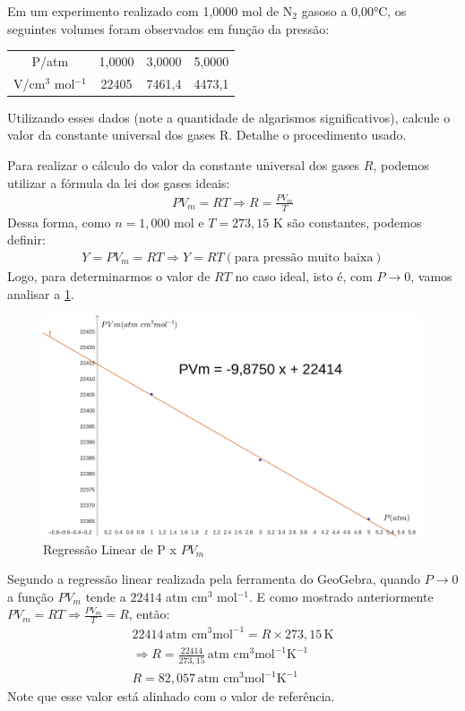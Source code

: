 \begin{xcs}
    Em um experimento realizado com 1,0000 mol de N\(_2\) gasoso a 0,00°C, os
    seguintes volumes foram observados em função da pressão: 
    \begin{center}
    \begin{tabular}{c | c c c}
    \hline
        P/atm & 1,0000 & 3,0000 & 5,0000\\
        V/cm\(^3\) mol\(^{-1}\) & 22405 & 7461,4 & 4473,1\\
    \hline
    \end{tabular}
    \end{center}
    Utilizando esses dados (note a quantidade de algarismos significativos),
    calcule o valor da constante universal dos gases R. Detalhe o procedimento
    usado.
\end{xcs}
\begin{rsl}
    
    Para realizar o cálculo do valor da constante universal dos gases \( R \),
    podemos utilizar a fórmula da lei dos gases ideais: 
    \begin{align*}
        PV_m = RT \Rightarrow R = \frac{PV_m}{T}
    \end{align*}
    Dessa forma, como \( n = 1,000 \) mol e \( T = 273,15 \) K são constantes,
    podemos definir:
    \begin{align*}
        Y = PV_m = RT \Rightarrow Y = RT (\text{para pressão
        muito baixa})
    \end{align*}
    Logo, para determinarmos o valor de \( RT \) no caso ideal, 
    isto é, com \( P \to 0 \), vamos analisar a \cref{reggeo}.

    \begin{figure}[H]
        \centering
        \includegraphics[width=.5\linewidth]{images/geogebra.png}
        \caption{Regressão Linear de P x \(PV_m\)}
        \label{reggeo}
    \end{figure}

    Segundo a regressão linear realizada pela ferramenta do GeoGebra, quando \(
    P \to 0 \) a função \( PV_m \) tende a \( 22414 \) atm cm\(^3\)
    mol\(^{-1}\). 
    E como mostrado anteriormente \( PV_m = RT \Rightarrow
    \frac{PV_m}{T} = R \), então:
    \begin{align*}
        22414 \, \text{atm cm}^3 \text{mol}^{-1} = R \times 273,15 \, \text{K}\\
        \Rightarrow R = \frac{22414}{273,15} \, \text{atm cm}^3
        \text{mol}^{-1} \text{K}^{-1}\\
        R = 82,057 \, \text{atm cm}^3 \text{mol}^{-1} \text{K}^{-1}
    \end{align*}
    Note que esse valor está alinhado com o valor de referência.
    
\end{rsl}
